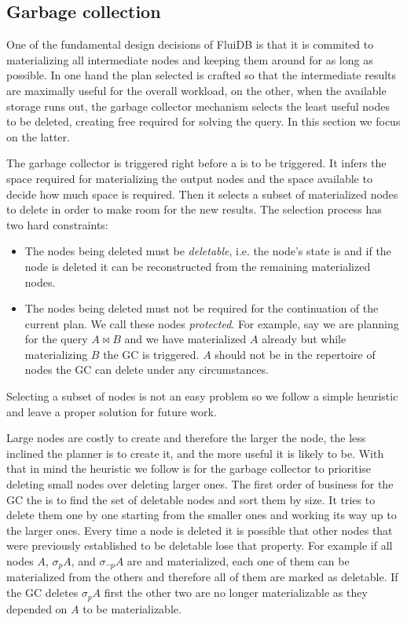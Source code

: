 \subsection{Garbage collection}
\label{sec:org1089d97}
One of the fundamental design decisions of FluiDB is that it is
commited to materializing all intermediate nodes and keeping them
around for as long as possible. In one hand the plan selected is
crafted so that the intermediate results are maximally useful for the
overall workload, on the other, when the available storage runs out,
the garbage collector mechanism selects the least useful nodes to be
deleted, creating free required for solving the query. In this section
we focus on the latter.

The garbage collector is triggered right before a  is to be
triggered. It infers the space required for materializing the output
nodes and the space available to decide how much space is
required. Then it selects a subset of materialized nodes to delete in
order to make room for the new results. The selection process has two
hard constraints:

\begin{itemize}
\item The nodes being deleted must be \emph{deletable}, i.e. the node's state
is  and if the node is deleted it can be reconstructed from
the remaining materialized nodes.
\item The nodes being deleted must not be required for the continuation of
the current plan. We call these nodes \emph{protected}. For example, say
we are planning for the query \(A \Join B\) and we have materialized
\(A\) already but while materializing \(B\) the GC is
triggered. \(A\) should not be in the repertoire of nodes the GC can
delete under any circumstances.
\end{itemize}

Selecting a subset of nodes is not an easy problem so we follow a
simple heuristic and leave a proper solution for future work.

Large nodes are costly to create and therefore the larger the node,
the less inclined the planner is to create it, and the more useful it
is likely to be. With that in mind the heuristic we follow is for the
garbage collector to prioritise deleting small nodes over deleting
larger ones. The first order of business for the GC the is to find the
set of deletable nodes and sort them by size. It tries to delete them
one by one starting from the smaller ones and working its way up to
the larger ones. Every time a node is deleted it is possible that
other nodes that were previously established to be deletable lose that
property. For example if all nodes \(A\), \(\sigma_p A\), and
\(\sigma_{\neg p} A\) are  and materialized, each one of them
can be materialized from the others and therefore all of them are
marked as deletable. If the GC deletes \(\sigma_p A\) first the other
two are no longer materializable as they depended on \(A\) to be
materializable.


